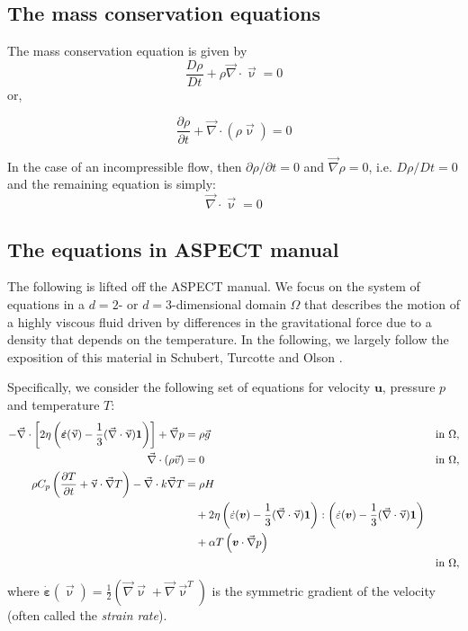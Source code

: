 \subsection{The mass conservation equations} 

The mass conservation equation is given by
\[
\frac{D\rho}{Dt} + \rho {\vec \nabla}\cdot{\vec \upnu} = 0
\]
or, 
\begin{mdframed}[backgroundcolor=blue!5]
\[
\frac{\partial \rho}{\partial t} + {\vec \nabla}\cdot(\rho {\vec \upnu}) = 0
\]
\end{mdframed}
In the case of an incompressible flow, then $\partial \rho/\partial t=0$ and 
${\vec \nabla}\rho=0$, i.e. $D\rho/Dt=0$ and the remaining equation is simply:
\[
{\vec \nabla}\cdot{\vec \upnu} = 0
\]

\subsection{The equations in ASPECT manual}
The following is lifted off the ASPECT manual.
We focus on the system of equations in a $d=2$- or $d=3$-dimensional
domain $\Omega$ that describes the motion of a highly viscous fluid driven
by differences in the gravitational force due to a density that depends on
the temperature. In the following, we largely follow the exposition of this
material in Schubert, Turcotte and Olson \cite{scto01}.

Specifically, we consider the following set of equations for velocity $\mathbf
u$, pressure $p$ and temperature $T$:
\begin{align}
  \label{eq:stokes-1}
  -\vec\nabla \cdot \left[2\eta \left(\dot{\bm \varepsilon}(\vec \upnu)
                                  - \frac{1}{3}(\vec\nabla \cdot \vec \upnu)\mathbf 1\right)
                \right] + \vec\nabla p &=
  \rho \vec g
  &
  & \textrm{in $\Omega$},
  \\
  \label{eq:stokes-2}
  \vec\nabla \cdot (\rho \vec v) &= 0
  &
  & \textrm{in $\Omega$},
  \\
  \label{eq:temperature}
  \rho C_p \left(\frac{\partial T}{\partial t} + \vec \upnu\cdot\vec\nabla T\right)
  - \vec\nabla\cdot k\vec\nabla T
  &=
  \rho H
  \notag
  \\
  &\quad
  +
  2\eta
  \left(\dot\varepsilon(\bm v) - \frac{1}{3}(\vec\nabla \cdot \vec \upnu)\mathbf 1\right)
  :
  \left(\dot\varepsilon(\bm v) - \frac{1}{3}(\vec\nabla \cdot \vec \upnu)\mathbf 1\right)
  \\
  &\quad
  +\alpha T \left( \bm v \cdot \vec\nabla p \right)
  \notag
  \\
  &\quad
  &
  & \textrm{in $\Omega$},
  \notag
\end{align}
where $\dot{\bm \varepsilon}(\vec\upnu) = \frac{1}{2}(\vec\nabla \vec\upnu + \vec\nabla \vec\upnu^T)$ is the symmetric gradient of the velocity (often called the
\textit{strain rate}).%

